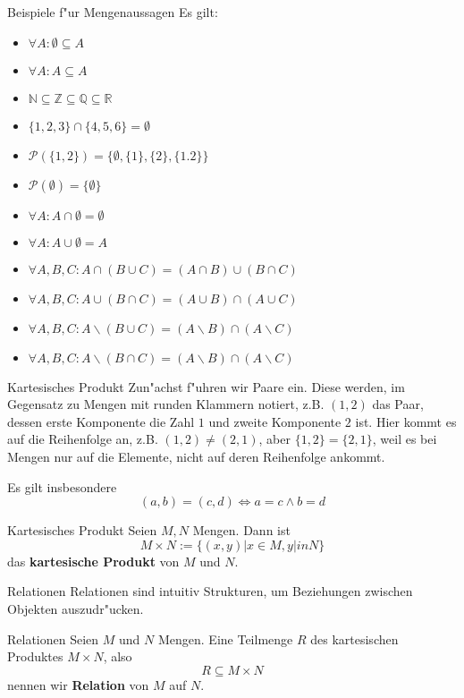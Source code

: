 \documentclass{beamer}
\begin{document}
\begin{frame}{Beispiele f"ur Mengenaussagen}
Es gilt:
\begin{itemize}
  \item $\forall A:\emptyset\subseteq A$
  \item $\forall A:A\subseteq A$
  \item $\mathbb{N}\subseteq\mathbb{Z}\subseteq\mathbb{Q}\subseteq\mathbb{R}$
  \item $\{1,2,3\}\cap\{4,5,6\}=\emptyset$
  \item $\mathscr{P}(\{1,2\})=\{\emptyset,\{1\},\{2\},\{1.2\}\}$
  \item $\mathscr{P}(\emptyset)=\{\emptyset\}$
  \item $\forall A: A\cap\emptyset=\emptyset$
  \item $\forall A:A\cup\emptyset=A$
  \item $\forall A,B,C: A\cap(B\cup C)=(A\cap B)\cup (B\cap C)$
  \item $\forall A,B,C: A\cup (B\cap C)=(A\cup B)\cap (A\cup C)$
  \item $\forall A,B,C: A\backslash(B\cup C)=(A\backslash B)\cap (A\backslash C)$
  \item $\forall A,B,C: A\backslash(B\cap C)=(A\backslash B)\cap (A\backslash C)$
\end{itemize}

\end{frame}

\begin{frame}{Kartesisches Produkt}
  Zun"achst f"uhren wir Paare ein. Diese werden, im Gegensatz zu Mengen mit runden Klammern notiert, z.B.
  $(1,2)$ das Paar, dessen erste Komponente die Zahl $1$ und zweite Komponente $2$ ist. Hier kommt es auf die Reihenfolge an, z.B. $(1,2)\neq(2,1)$, aber $\{1,2\}=\{2,1\}$, weil 
  es bei Mengen nur auf die Elemente, nicht auf deren Reihenfolge ankommt.
  
  Es gilt insbesondere \[(a,b)=(c,d)\Leftrightarrow a=c\wedge b=d\]
  \begin{definition}{Kartesisches Produkt}
    Seien $M,N$ Mengen. Dann ist \[M\times N:=\{(x,y)|x\in M,y|in N\}\] das \textbf{kartesische Produkt} von $M$ und $N$.
  \end{definition}
  
\end{frame}

\begin{frame}{Relationen}
 Relationen sind intuitiv Strukturen, um Beziehungen zwischen Objekten auszudr"ucken.
 \begin{definition}{Relationen}
  Seien $M$ und $N$ Mengen. Eine Teilmenge $R$ des kartesischen Produktes $M\times N$, also 
  \[R\subseteq M\times N\] nennen wir \textbf{Relation} von $M$ auf $N$.
 \end{definition}
\end{frame}
\end{document}
